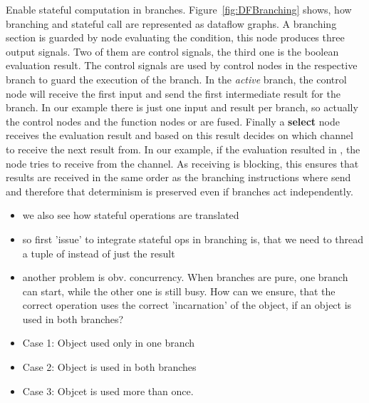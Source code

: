Enable stateful computation in branches. Figure~\ref{fig:DFBranching} shows, how branching and stateful call are represented as dataflow graphs. A branching section is guarded by node evaluating the condition, this node produces three output signals. Two of them are control signals, the third one is the boolean evaluation result. The control signals are used by control nodes in the respective branch to guard the execution of the branch. In the \emph{active} branch, the control node will receive the first input and send the first intermediate result for the branch. In our example there is just one input and result per branch, so actually the control nodes and the function nodes  or  are fused. Finally a \textbf{select} node receives the evaluation result and based on this result decides on which channel to receive the next result from. In our example, if the evaluation resulted in , the  node tries to receive from the  channel. As receiving is blocking, this ensures that results are received in the same order as the branching instructions where send and therefore that determinism is preserved even if branches act independently.  
\begin{itemize}
    \item we also see how stateful operations are translated
    \item so first 'issue' to integrate stateful ops in branching is, that we need to thread a tuple of  instead of just the result
    \item another problem is obv. concurrency. When branches are pure, one branch can start, while the other one is still busy. How can we ensure, that the correct operation uses the correct 'incarnation' of the object, if an object is used in both branches?
    \item Case 1: Object used only in one branch
    \item Case 2: Object is used in both branches
    \item Case 3: Objcet is used more than once.
\end{itemize}
